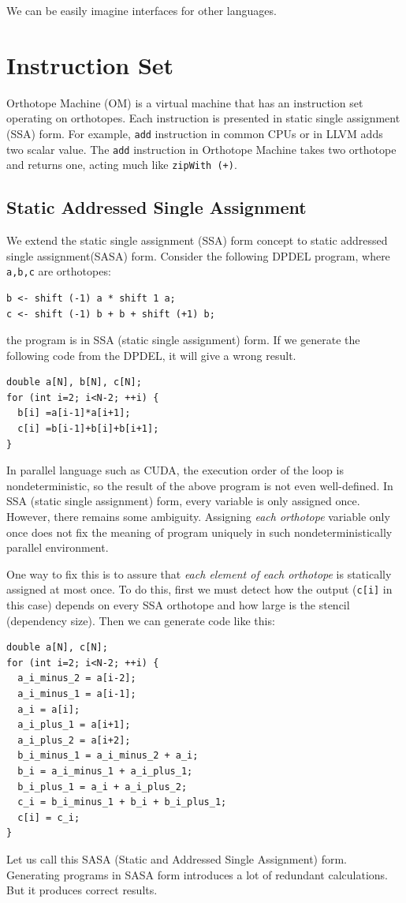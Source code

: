 \documentclass[twocolumn]{article}
\begin{document}
We can be easily imagine interfaces for other languages.


\section{Instruction Set}

Orthotope Machine (OM) is a virtual machine that has an instruction set
operating on orthotopes. Each instruction is presented in static single
assignment (SSA) form. For example, {\tt add} instruction in common CPUs or in
LLVM adds two scalar value. The {\tt add} instruction in Orthotope Machine
takes two orthotope and returns one, acting much like {\tt zipWith (+)}.

\subsection{Static Addressed Single Assignment} \label{SectionSASA}

We extend the static single assignment (SSA) form concept to static addressed
single assignment(SASA) form.  Consider the following DPDEL program, where
{\tt a,b,c} are orthotopes:
\begin{verbatim}
b <- shift (-1) a * shift 1 a;
c <- shift (-1) b + b + shift (+1) b;
\end{verbatim}
the program is in SSA (static single assignment) form.
If we generate the following code from the DPDEL, it will give a wrong result.
\begin{verbatim}
double a[N], b[N], c[N];
for (int i=2; i<N-2; ++i) {
  b[i] =a[i-1]*a[i+1];
  c[i] =b[i-1]+b[i]+b[i+1];
}
\end{verbatim}
In parallel language such as CUDA, the execution order of the loop is
nondeterministic, so the result of the above program is not even
well-defined. In SSA (static single assignment) form, every variable is only
assigned once. However, there remains some ambiguity.  Assigning {\em each
  orthotope} variable only once does not fix the meaning of program uniquely
in such nondeterministically parallel environment.

One way to fix this is to assure that {\em each element of each orthotope} is
statically assigned at most once. To do this, first we must detect how the
output ({\tt c[i]} in this case) depends on every SSA orthotope and how large
is the stencil (dependency size). Then we can generate code like this:
\begin{verbatim}
double a[N], c[N];
for (int i=2; i<N-2; ++i) {
  a_i_minus_2 = a[i-2];
  a_i_minus_1 = a[i-1];
  a_i = a[i];
  a_i_plus_1 = a[i+1];
  a_i_plus_2 = a[i+2];
  b_i_minus_1 = a_i_minus_2 + a_i;
  b_i = a_i_minus_1 + a_i_plus_1;
  b_i_plus_1 = a_i + a_i_plus_2;
  c_i = b_i_minus_1 + b_i + b_i_plus_1;
  c[i] = c_i;
}
\end{verbatim}
Let us call this SASA (Static and Addressed Single Assignment)
form. Generating programs in SASA form introduces a lot of redundant
calculations. But it produces correct results.
\end{document}
